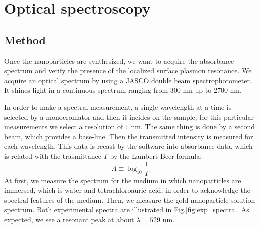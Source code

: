 \documentclass[prb,twocolumn]{revtex4-1}
\begin{document}
\section{Optical spectroscopy}

\subsection{Method}
Once the nanoparticles are synthesized, we want to acquire the absorbance spectrum and verify the presence of the localized surface plasmon resonance. We acquire an optical spectrum by using a JASCO double beam spectrophotometer. It shines light in a continuous spectrum ranging from $300$ nm up to $2700$ nm. 

In order to make a spectral measurement, a single-wavelength at a time is selected by a monocromator and then it incides on the sample; for this particular measurements we select a resolution of $1$ nm. The same thing is done by a second beam, which provides a base-line. Then the transmitted intensity is measured for each wavelength. This data is recast by the software into absorbance data, which is related with the trasmittance $T$ by the Lambert-Beer formula:
\begin{equation}
    A \equiv \log_{10} \frac{1}{T}
\end{equation}
At first, we measure the spectrum for the medium in which nanoparticles are immersed, which is water and tetrachloroauric acid, in order to acknowledge the spectral features of the medium. Then, we measure the gold nanoparticle solution spectrum. Both experimental spectra are illustrated in Fig.\ref{fig:exp_spectra}.
As expected, we see a resonant peak at about $\lambda = 529$ nm.
\end{document}

